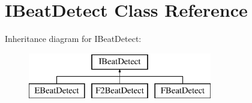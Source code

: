 \hypertarget{class_i_beat_detect}{}\section{I\+Beat\+Detect Class Reference}
\label{class_i_beat_detect}
Inheritance diagram for I\+Beat\+Detect\+:\begin{figure}[H]
\begin{center}
\leavevmode
\includegraphics[height=2.000000cm]{class_i_beat_detect}
\end{center}
\end{figure}
